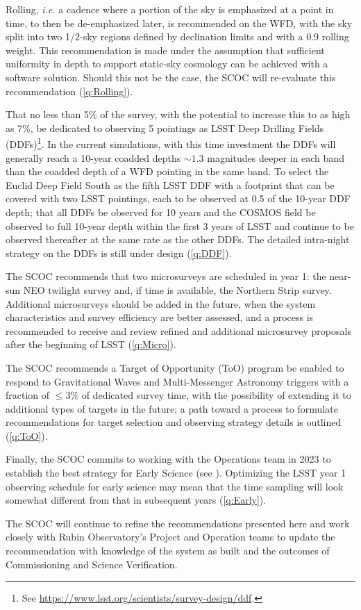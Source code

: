 \hangindent=0.7cm Rolling, \emph{i.e.} a cadence where a portion of the sky is emphasized at a point in time, to then be de-emphasized later, is recommended on the WFD, with the sky split into two 1/2-sky regions defined by declination limits and with a 0.9 rolling weight. This recommendation is made under the assumption that sufficient uniformity in depth to support static-sky cosmology can be achieved with a software solution.  Should this not be the case, the SCOC will re-evaluate this recommendation (\autoref{q:Rolling}).

\hangindent=0.7cm That no less than 5\% of the survey, with the potential to increase this to as high as 7\%, be dedicated to observing 5 pointings as LSST Deep Drilling Fields (DDFs)\footnote{See \url{https://www.lsst.org/scientists/survey-design/ddf}.}. In the current simulations, with this time investment the DDFs will generally reach a 10-year coadded depths $\sim1.3$ magnitudes deeper in each band than the coadded depth of a WFD pointing in the same band. To select the Euclid Deep Field South as the fifth LSST DDF with a footprint that can be covered with two LSST pointings, each to be observed at 0.5 of the 10-year DDF depth;  that all DDFs be observed for 10 years and the COSMOS field be observed to full 10-year depth within the first 3 years of LSST and continue to be observed thereafter at the same rate as the other DDFs. The detailed intra-night strategy on the DDFs is still under design (\autoref{q:DDF}).

\hangindent=0.7cm The SCOC recommends that two microsurveys are scheduled  in year 1: the near-sun NEO twilight survey and, if time is
available, the Northern Strip survey. Additional microsurveys should be added in the future, when the system characteristics and survey efficiency are better assessed, and a process is recommended to receive and review refined and additional microsurvey proposals after the beginning of LSST (\autoref{q:Micro}).

\hangindent=0.7cm The SCOC recommends a Target of Opportunity (ToO) program be enabled to respond to Gravitational Waves and Multi-Messenger Astronomy triggers with a fraction of $\leq 3\%$ of dedicated survey time, with the possibility of extending it to additional types of targets in the future; a path toward a process to formulate recommendations for target selection and observing strategy details is outlined (\autoref{q:ToO}).

\hangindent=0.7cm Finally, the SCOC commits to working with the Operations team in 2023 to establish the best strategy for Early Science (see \citealt{rtn-011}). Optimizing the LSST year 1 observing schedule for early science may mean that the time  sampling will look somewhat different from that in subsequent years (\autoref{q:Early}).

\noindent The SCOC will continue to refine the recommendations presented here and work closely with Rubin Observatory's Project and Operation teams to update the recommendation with knowledge of the system as built and the outcomes of Commissioning and Science Verification.